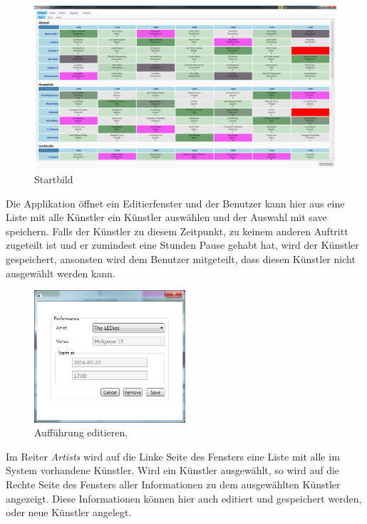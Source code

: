 \documentclass[12pt, a4paper]{article}
\begin{document}
\begin{figure}[h] 	
	\centering
		\includegraphics[width=1.0\textwidth]{Startbild.png}
	\caption{Startbild}
\end{figure}

Die Applikation öffnet ein Editierfenster und der Benutzer kann hier aus eine Liste mit alle Künstler ein Künstler auswählen und der Auswahl mit save speichern. Falls der Künstler zu diesem Zeitpunkt, zu keinem anderen Auftritt zugeteilt ist und er zumindest eine Stunden Pause gehabt hat, wird der Künstler gespeichert, ansonsten wird dem Benutzer mitgeteilt, dass diesen Künstler nicht ausgewählt werden kann.

\begin{figure}[h] 	
	\centering
		\includegraphics[width=0.5\textwidth]{EditPerformance.png}
	\caption{Aufführung editieren.}
\end{figure}

\clearpage 
Im Reiter \textit{Artists} wird auf die Linke Seite des Fensters eine Liste mit alle im System vorhandene Künstler. Wird ein Künstler ausgewählt, so wird auf die Rechte Seite des Fensters aller Informationen zu dem ausgewählten Künstler angezeigt. Diese Informationen können hier auch editiert und gespeichert werden, oder neue Künstler angelegt.
\end{document}
